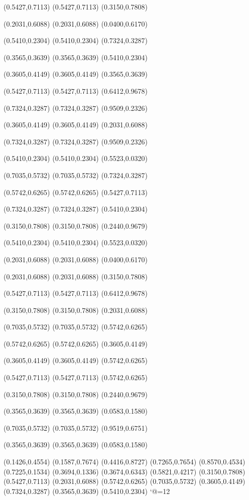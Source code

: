 \PST@Border(0.5427,0.7113)
(0.5427,0.7113)
(0.3150,0.7808)

\PST@Border(0.2031,0.6088)
(0.2031,0.6088)
(0.0400,0.6170)

\PST@Border(0.5410,0.2304)
(0.5410,0.2304)
(0.7324,0.3287)

\PST@Border(0.3565,0.3639)
(0.3565,0.3639)
(0.5410,0.2304)

\PST@Border(0.3605,0.4149)
(0.3605,0.4149)
(0.3565,0.3639)

\PST@Border(0.5427,0.7113)
(0.5427,0.7113)
(0.6412,0.9678)

\PST@Border(0.7324,0.3287)
(0.7324,0.3287)
(0.9509,0.2326)

\PST@Border(0.3605,0.4149)
(0.3605,0.4149)
(0.2031,0.6088)

\PST@Border(0.7324,0.3287)
(0.7324,0.3287)
(0.9509,0.2326)

\PST@Border(0.5410,0.2304)
(0.5410,0.2304)
(0.5523,0.0320)

\PST@Border(0.7035,0.5732)
(0.7035,0.5732)
(0.7324,0.3287)

\PST@Border(0.5742,0.6265)
(0.5742,0.6265)
(0.5427,0.7113)

\PST@Border(0.7324,0.3287)
(0.7324,0.3287)
(0.5410,0.2304)

\PST@Border(0.3150,0.7808)
(0.3150,0.7808)
(0.2440,0.9679)

\PST@Border(0.5410,0.2304)
(0.5410,0.2304)
(0.5523,0.0320)

\PST@Border(0.2031,0.6088)
(0.2031,0.6088)
(0.0400,0.6170)

\PST@Border(0.2031,0.6088)
(0.2031,0.6088)
(0.3150,0.7808)

\PST@Border(0.5427,0.7113)
(0.5427,0.7113)
(0.6412,0.9678)

\PST@Border(0.3150,0.7808)
(0.3150,0.7808)
(0.2031,0.6088)

\PST@Border(0.7035,0.5732)
(0.7035,0.5732)
(0.5742,0.6265)

\PST@Border(0.5742,0.6265)
(0.5742,0.6265)
(0.3605,0.4149)

\PST@Border(0.3605,0.4149)
(0.3605,0.4149)
(0.5742,0.6265)

\PST@Border(0.5427,0.7113)
(0.5427,0.7113)
(0.5742,0.6265)

\PST@Border(0.3150,0.7808)
(0.3150,0.7808)
(0.2440,0.9679)

\PST@Border(0.3565,0.3639)
(0.3565,0.3639)
(0.0583,0.1580)

\PST@Border(0.7035,0.5732)
(0.7035,0.5732)
(0.9519,0.6751)

\PST@Border(0.3565,0.3639)
(0.3565,0.3639)
(0.0583,0.1580)

\PST@Fillcircle(0.1426,0.4554)
\PST@Fillcircle(0.1587,0.7674)
\PST@Fillcircle(0.4416,0.8727)
\PST@Fillcircle(0.7265,0.7654)
\PST@Fillcircle(0.8570,0.4534)
\PST@Fillcircle(0.7225,0.1534)
\PST@Fillcircle(0.3694,0.1336)
\PST@Fillcircle(0.3674,0.6343)
\PST@Fillcircle(0.5821,0.4217)
\PST@Circle(0.3150,0.7808)
\PST@Circle(0.5427,0.7113)
\PST@Circle(0.2031,0.6088)
\PST@Circle(0.5742,0.6265)
\PST@Circle(0.7035,0.5732)
\PST@Circle(0.3605,0.4149)
\PST@Circle(0.7324,0.3287)
\PST@Circle(0.3565,0.3639)
\PST@Circle(0.5410,0.2304)
\catcode`@=12
\fi
\endpspicture
